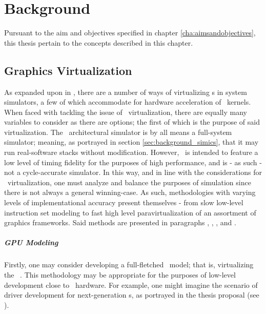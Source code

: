 
\chapter{Background}
\label{cha:background}
Pursuant to the aim and objectives specified in chapter \ref{cha:aimsandobjectives}, this thesis pertain to the concepts described in this chapter.

\section{Graphics Virtualization}
\label{sec:background_graphicsvirtualization}
As expanded upon in , there are a number of ways of virtualizing \dvttermgpu s in system simulators, a few of which accommodate for hardware acceleration of \dvttermgpu\ kernels.
When faced with tackling the issue of \dvttermgpu\ virtualization, there are equally many variables to consider as there are options; the first of which is the purpose of said virtualization.
The \dvttermsimics\ architectural simulator is by all means a full-system simulator; meaning, as portrayed in section \ref{sec:background_simics}, that it may run real-software stacks without modification.
However, \dvttermsimics\ is intended to feature a low level of timing fidelity for the purposes of high performance, and is - as such - not a cycle-accurate simulator.
In this way, and in line with the considerations for \dvttermgpu\ virtualization, one must analyze and balance the purposes of simulation since there is not always a general winning-case.
As such, methodologies with varying levels of implementational accuracy present themselves - from slow low-level instruction set modeling to fast high level paravirtualization of an assortment of graphics frameworks.
Said methods are presented in paragraphs , , , and .


\paragraph{GPU Modeling}
\label{par:background_graphicsvirtualization_gpumodeling}
Firstly, one may consider developing a full-fletched \dvttermgpu\ model; that is, virtualizing the \dvttermgpu\ \dvttermisa .
This methodology may be appropriate for the purposes of low-level development close to \dvttermgpu\ hardware.
For example, one might imagine the scenario of driver development for next-generation \dvttermgpu s, as portrayed in the thesis proposal (see ).

